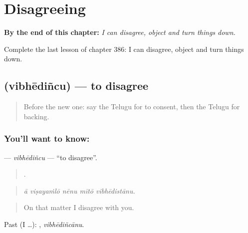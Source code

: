 
\chapter{Disagreeing}
\label{ch:te-disagreeing}

\begin{chapteropening}
\textbf{By the end of this chapter:} \emph{I can disagree, object and turn things down.}

Complete the last lesson of chapter 386: I can disagree, object and turn things down.
\end{chapteropening}

\section[\texorpdfstring{\te{విభేదించు} (vibhēdiñcu)}{విభేదించు (vibhēdiñcu)}]{ (vibhēdiñcu) — to disagree}

\label{lesson:TE-C386-vibhedincu}



\begin{quote}
Before the new one: say the Telugu for to consent, then the Telugu for backing.
\end{quote}

\subsection*{You'll want to know: }
\textbf{} — \emph{vibhēdiñcu} — \textquotedblleft{}to disagree\textquotedblright{}.

\begin{quote}
    .
\end{quote}

\begin{quote}
\emph{ā viṣayaṁlō nēnu mītō vibhēdistānu.}
\end{quote}

\begin{quote}
On that matter I disagree with you.
\end{quote}

Past (I …): , \emph{vibhēdiñcānu}.

